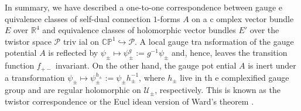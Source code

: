 \documentclass[a4paper,11pt,english]{article}
\numberwithin{equation}{section}
\renewcommand{\=}{\ =\ }
\begin{document}
In summary, we have described a one-to-one correspondence between gauge e%
quivalence classes of self-dual connection $1$-forms ${A}$ on a c%
omplex vector bundle $E$ over $\mathbb{R}^4$  and equivalence classes of %
holomorphic vector bundles $E'$ over the twistor space $\mathcal{P}$ triv%
ial on $\mathbb{CP}^1\hookrightarrow\mathcal{P}$. A local gauge tra%
nsformation of the gauge potential ${A}$ is reflected by 
$\psi_\pm\mapsto\psi^g_\pm:=g^{-1}\psi_\pm$ and, hence, leaves the %
 transition function $f_{+-}$ invariant. On the other hand, the gauge pot%
ential ${A}$ is inert under a transformation $\psi_\pm%
\mapsto\psi^{h_\pm}_\pm:=\psi_\pm h_\pm^{-1}$, where $h_\pm$ live in th%
e complexified gauge group and are regular holomorphic on $\mathcal{U}_\pm$, 
respectively. This is known as the twistor correspondence or the Eucl%
idean version of Ward's theorem \cite{Atiyah:1977pw,WardWells}.


\vfill\eject
\end{document}
